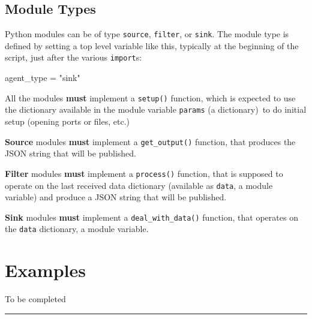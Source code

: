 \documentclass[
  letterpaper,
  DIV=11,
  numbers=noendperiod]{scrartcl}
\newenvironment{Shaded}{\begin{snugshade}}{\end{snugshade}}
\newcommand{\NormalTok}[1]{\textcolor[rgb]{0.00,0.23,0.31}{#1}}
\newcommand{\OperatorTok}[1]{\textcolor[rgb]{0.37,0.37,0.37}{#1}}
\newcommand{\StringTok}[1]{\textcolor[rgb]{0.13,0.47,0.30}{#1}}
\begin{document}
\subsection{Module Types}\label{module-types}

Python modules can be of type \texttt{source}, \texttt{filter}, or
\texttt{sink}. The module type is defined by setting a top level
variable like this, typically at the beginning of the script, just after
the various \texttt{import}s:

\begin{Shaded}
\begin{Highlighting}[]
\NormalTok{agent\_type }\OperatorTok{=} \StringTok{"sink"}
\end{Highlighting}
\end{Shaded}

All the modules \textbf{must} implement a \texttt{setup()} function,
which is expected to use the dictionary available in the module variable
\texttt{params} (a dictionary)~to do initial setup (opening ports or
files, etc.)

\textbf{Source} modules \textbf{must} implement a \texttt{get\_output()}
function, that produces the JSON string that will be published.

\textbf{Filter} modules \textbf{must} implement a \texttt{process()}
function, that is supposed to operate on the last received data
dictionary (available as \texttt{data}, a module variable) and produce a
JSON string that will be published.

\textbf{Sink} modules \textbf{must} implement a
\texttt{deal\_with\_data()} function, that operates on the \texttt{data}
dictionary, a module variable.

\section{Examples}\label{examples}

\begin{tcolorbox}[enhanced jigsaw, bottomtitle=1mm, opacitybacktitle=0.6, toprule=.15mm, breakable, colbacktitle=quarto-callout-note-color!10!white, title=\textcolor{quarto-callout-note-color}{\faInfo}\hspace{0.5em}{Note}, leftrule=.75mm, toptitle=1mm, colframe=quarto-callout-note-color-frame, bottomrule=.15mm, coltitle=black, titlerule=0mm, rightrule=.15mm, arc=.35mm, left=2mm, colback=white, opacityback=0]

To be completed

\end{tcolorbox}

\begin{center}\rule{0.5\linewidth}{0.5pt}\end{center}
\end{document}
